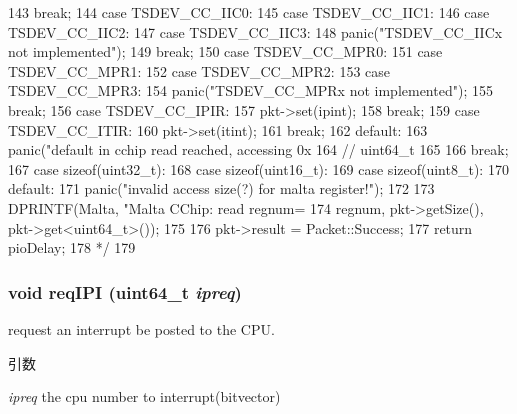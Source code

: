 \begin{DoxyCode}
{{{143                   break;
144               case TSDEV_CC_IIC0:
145               case TSDEV_CC_IIC1:
146               case TSDEV_CC_IIC2:
147               case TSDEV_CC_IIC3:
148                   panic("TSDEV_CC_IICx not implemented\n");
149                   break;
150               case TSDEV_CC_MPR0:
151               case TSDEV_CC_MPR1:
152               case TSDEV_CC_MPR2:
153               case TSDEV_CC_MPR3:
154                   panic("TSDEV_CC_MPRx not implemented\n");
155                   break;
156               case TSDEV_CC_IPIR:
157                   pkt->set(ipint);
158                   break;
159               case TSDEV_CC_ITIR:
160                   pkt->set(itint);
161                   break;
162               default:
163                   panic("default in cchip read reached, accessing 0x%
164            } // uint64_t
165 
166       break;
167       case sizeof(uint32_t):
168       case sizeof(uint16_t):
169       case sizeof(uint8_t):
170       default:
171         panic("invalid access size(?) for malta register!\n");
172     }
173     DPRINTF(Malta, "Malta CChip: read  regnum=%
174             regnum, pkt->getSize(), pkt->get<uint64_t>());
175 
176     pkt->result = Packet::Success;
177     return pioDelay;
178     */
179 }
\end{DoxyCode}
\hypertarget{classMaltaCChip_a1f4571959aa97b26452f6accc79abffe}{
\subsubsection[{reqIPI}]{\setlength{\rightskip}{0pt plus 5cm}void reqIPI (uint64\_\-t {\em ipreq})}}
\label{classMaltaCChip_a1f4571959aa97b26452f6accc79abffe}
request an interrupt be posted to the CPU. 
\begin{DoxyParams}{引数}
\item[{\em ipreq}]the cpu number to interrupt(bitvector) \end{DoxyParams}



